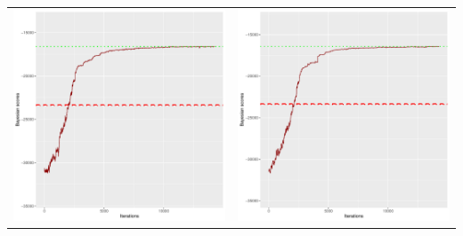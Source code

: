 \documentclass[]{scrartcl}
\begin{document}
\begin{table}[h!]
\begin{tabular}{cc}
\includegraphics[scale = 0.4]{./figs/win95pts/v1/25/bayBoundsEvolution-14252.pdf} & 
\includegraphics[scale = 0.4]{./figs/win95pts/v1/50/bayBoundsEvolution-14252.pdf} \\

\end{tabular}
\end{table}
\end{document}
